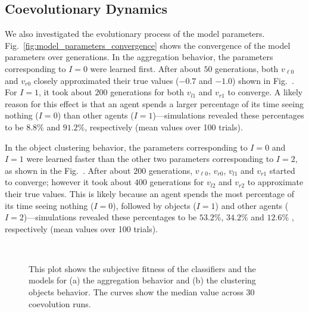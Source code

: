 \subsection{Coevolutionary Dynamics}\label{sec:coevolutionary_dynamics_simulation_swarm_simulation}

We also investigated the evolutionary process of the model parameters. Fig.~\ref{fig:model_parameters_convergence} shows the convergence of the model parameters over generations. In the aggregation behavior, the parameters corresponding to $I=0$ were learned first. After about $50$ generations, both $v_{\ell0}$ and $v_{r0}$ closely approximated their true values ($-0.7$ and $-1.0$) shown in Fig.~. For $I=1$, it took about $200$ generations for both $v_{l1}$ and $v_{r1}$ to converge. A likely reason for this effect is that an agent spends a larger percentage of its time seeing nothing ($I=0$) than other agents ($I=1$)---simulations revealed these percentages to be $8.8\%$ and $91.2\%$, respectively (mean values over 100 trials). 

In the object clustering behavior, the parameters corresponding to $I=0$ and $I=1$ were learned faster than the other two parameters corresponding to $I=2$, as shown in the Fig.~. After about $200$ generations, $v_{\ell0}$, $v_{r0}$, $v_{l1}$ and $v_{r1}$ started to converge; however it took about $400$ generations for $v_{l2}$ and $v_{r2}$ to approximate their true values. This is likely because an agent spends the most percentage of its time seeing nothing ($I=0$), followed by objects ($I=1$) and other agents ($I=2$)---simulations revealed these percentages to be $53.2\%$, $34.2\%$ and $12.6\%$ , respectively (mean values over 100 trials).

\begin{figure}[!t]%
	\centering
		\\
		\caption{This plot shows the subjective fitness of the classifiers and
		the models for (a) the aggregation behavior and (b) the clustering objects behavior.
		The curves show the median value across 30 coevolution runs.\label{fig:fitness_dynamics_simulation}}
\end{figure}

